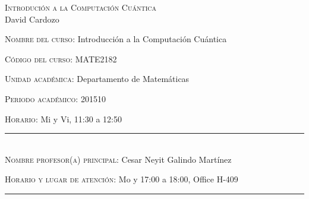\begin{center}
\textsc{\large Introdución a la Computación Cuántica }\\[0.1cm]
\large David Cardozo\\[0.5cm]
\end{center}	

\large \noindent\textsc{Nombre del curso:}  Introducción a la Computación Cuántica %

\noindent\textsc{Código del curso:} MATE2182 %

\noindent\textsc{Unidad académica:} Departamento de Matemáticas

\noindent\textsc{Periodo acad\'emico:} 201510 %

\noindent\textsc{Horario:} Mi y Vi, 11:30 a 12:50%

\noindent\rule{\textwidth}{1pt}\\[-0.3cm]

\normalsize \noindent\textsc{Nombre profesor(a) principal:} Cesar Neyit Galindo Martínez %


\noindent\textsc{Horario y lugar de atenci\'on:} Mo y  17:00 a
18:00, Office H-409

\noindent\rule{\textwidth}{1pt}\\[-0.1cm]